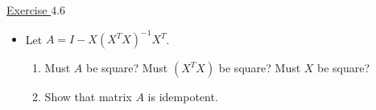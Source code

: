\underline{Exercise $4.6$}
\begin{itemize}

\item[6.]  Let \( A=I-X\left(X^T X\right)^{-1} X^T \).
\begin{enumerate}
\item[(a)] Must $A$ be square? Must $\left(X^T X\right)$ be square? Must $X$ be square?
\item[(b)] Show that matrix $A$ is idempotent.
\end{enumerate}
\end{itemize}
